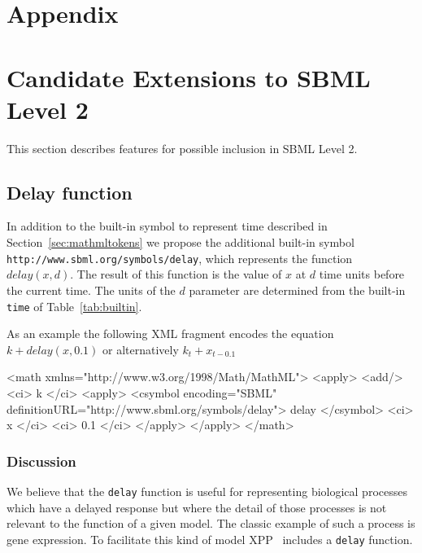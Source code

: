 \documentclass[10pt]{cekarticle}
\newcommand{\vref}[1]{\ref{#1}}
\begin{document}

\newpage
\section{Appendix}
\setcounter{secnumdepth}{2}
\appendix
\section{Candidate Extensions to SBML Level 2}
\label{apdx:extensions}
This section describes features for possible inclusion in SBML Level 2.

\subsection{Delay function}
\label{sec:delay}

In addition to the built-in symbol to represent time described in Section~\ref{sec:mathmltokens} we propose the additional built-in symbol \texttt{http://www.sbml.org/symbols/delay}, which represents the function $delay(x, d)$.  The result of this function is the value of $x$ at $d$ time units before the current time.  The units of the $d$ parameter are determined from the built-in \texttt{time} of Table~\vref{tab:builtin}.

As an example the following XML fragment encodes the equation $k + delay(x, 0.1)$ or alternatively $k_t + x_{t - 0.1}$

\begin{example}
<math xmlns="http://www.w3.org/1998/Math/MathML">
    <apply>
        <add/>
        <ci> k </ci>
        <apply>
            <csymbol encoding="SBML"
                        definitionURL="http://www.sbml.org/symbols/delay">
                delay
            </csymbol>
            <ci> x </ci>
            <ci> 0.1 </ci>
        </apply>
    </apply>
</math>
\end{example}

\subsubsection{Discussion}
\label{sec:delaydiscuss}
We believe that the \texttt{delay} function is useful for representing biological processes which have a delayed response but where the detail of those processes is not relevant to the function of a given model.  The classic example of such a process is gene expression.  To facilitate this kind of model XPP~\citep{ermentrout:2001} includes a \texttt{delay} function.
\end{document}
